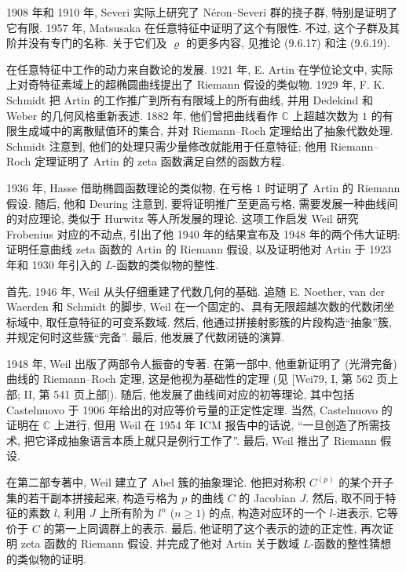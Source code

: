 1908 年和 1910 年, Severi 实际上研究了 Néron--Severi 群的挠子群, 特别是证明了它有限. 1957 年, Matsusaka 在任意特征中证明了这个有限性. 不过, 这个子群及其阶并没有专门的名称. 关于它们及 $\varrho$ 的更多内容, 见推论 (9.6.17) 和注 (9.6.19).

在任意特征中工作的动力来自数论的发展. 1921 年, E. Artin 在学位论文中, 实际上对奇特征素域上的超椭圆曲线提出了 Riemann 假设的类似物. 1929 年, F. K. Schmidt 把 Artin 的工作推广到所有有限域上的所有曲线, 并用 Dedekind 和 Weber 的几何风格重新表述. 1882 年,
他们曾把曲线看作 $\mathbb C$ 上超越次数为 $1$ 的有限生成域中的离散赋值环的集合, 并对 Riemann--Roch 定理给出了抽象代数处理. Schmidt 注意到, 他们的处理只需少量修改就能用于任意特征; 他用 Riemann--Roch 定理证明了 Artin 的 zeta 函数满足自然的函数方程.

1936 年, Hasse 借助椭圆函数理论的类似物, 在亏格 $1$ 时证明了 Artin 的 Riemann 假设. 随后, 他和 Deuring 注意到, 要将证明推广至更高亏格, 需要发展一种曲线间的对应理论, 类似于 Hurwitz 等人所发展的理论. 这项工作启发 Weil 研究 Frobenius 对应的不动点, 引出了他 1940 年的结果宣布及 1948 年的两个伟大证明: 证明任意曲线 zeta 函数的 Artin 的 Riemann 假设, 以及证明他对 Artin 于 1923 年和 1930 年引入的 $L$-函数的类似物的整性.

首先, 1946 年, Weil 从头仔细重建了代数几何的基础. 追随 E. Noether, van der Waerden 和 Schmidt 的脚步, Weil 在一个固定的、具有无限超越次数的代数闭坐标域中, 取任意特征的可变系数域. 然后, 他通过拼接射影簇的片段构造“抽象”簇, 并规定何时这些簇“完备”. 最后, 他发展了代数闭链的演算.

1948 年, Weil 出版了两部令人振奋的专著. 在第一部中, 他重新证明了 (光滑完备) 曲线的 Riemann--Roch 定理, 这是他视为基础性的定理 (见 [Wei79, I, 第 562 页上部; II, 第 541 页上部]). 随后, 他发展了曲线间对应的初等理论, 其中包括 Castelnuovo 于 1906 年给出的对应等价亏量的正定性定理. 当然, Castelnuovo 的证明在 $\mathbb C$ 上进行, 但用 Weil 在 1954 年 ICM 报告中的话说, “一旦创造了所需技术, 把它译成抽象语言本质上就只是例行工作了”. 最后, Weil 推出了 Riemann 假设.

在第二部专著中, Weil 建立了 Abel 簇的抽象理论. 他把对称积 $C^{(p)}$ 的某个开子集的若干副本拼接起来, 构造亏格为 $p$ 的曲线 $C$ 的 Jacobian $J$. 然后, 取不同于特征的素数 $l$, 利用 $J$ 上所有阶为 $l^n$ ($n\geq1$) 的点, 构造对应环的一个 $l$-进表示, 它等价于 $C$ 的第一上同调群上的表示. 最后, 他证明了这个表示的迹的正定性, 再次证明 zeta 函数的 Riemann 假设, 并完成了他对 Artin 关于数域 $L$-函数的整性猜想的类似物的证明.

